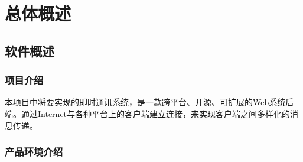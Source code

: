 \chapter{总体概述}


\section{软件概述}
\subsection{项目介绍}

本项目中将要实现的即时通讯系统，是一款跨平台、开源、可扩展的Web系统后端。通过Internet与各种平台上的客户端建立连接，来实现客户端之间多样化的消息传递。

\subsection{产品环境介绍}

